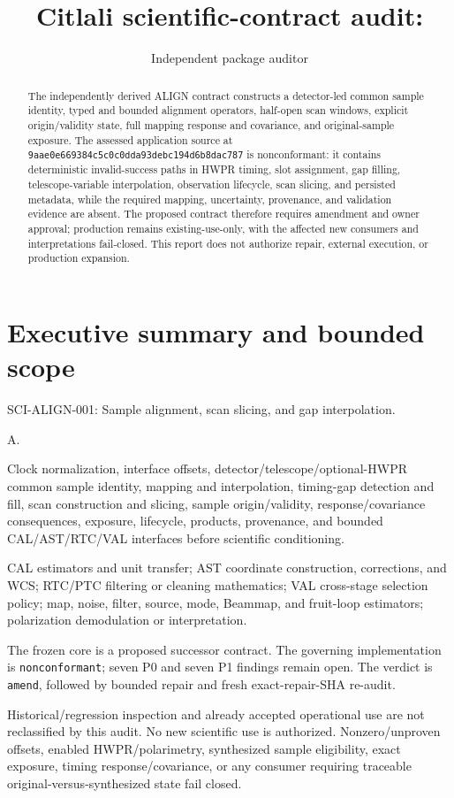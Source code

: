 \documentclass[11pt]{article}
\title{\AuditPackageName\\
\large Citlali scientific-contract audit: \AuditPackageID}
\author{Independent package auditor}
\date{\AuditDate}
\newcommand{\code}[1]{\nolinkurl{#1}}
\newcommand{\AuditPackageID}{SCI-ALIGN-001}
\newcommand{\AuditPackageName}{Sample alignment, scan slicing, and gap interpolation}
\newcommand{\AuditTier}{A}
\newcommand{\AuditGoverningSHAPrint}{\code{9aae0e669384c5c0c0dd}\allowbreak\code{a93debc194d6b8dac787}}
\begin{document}
\maketitle

\begin{abstract}
The independently derived ALIGN contract constructs a detector-led common
sample identity, typed and bounded alignment operators, half-open scan
windows, explicit origin/validity state, full mapping response and covariance,
and original-sample exposure.  The assessed application source at
\AuditGoverningSHAPrint{} is nonconformant: it contains deterministic
invalid-success paths in HWPR timing, slot assignment, gap filling,
telescope-variable interpolation, observation lifecycle, scan slicing, and
persisted metadata, while the required mapping, uncertainty, provenance, and
validation evidence are absent.  The proposed contract therefore requires
amendment and owner approval; production remains existing-use-only, with the
affected new consumers and interpretations fail-closed.  This report does not
authorize repair, external execution, or production expansion.
\end{abstract}
\section{Executive summary and bounded scope}

\begin{description}[style=nextline]
\item[Package] \AuditPackageID: \AuditPackageName.
\item[Tier] \AuditTier.
\item[Included transformation] Clock normalization, interface offsets,
detector/telescope/optional-HWPR common sample identity, mapping and
interpolation, timing-gap detection and fill, scan construction and slicing,
sample origin/validity, response/covariance consequences, exposure, lifecycle,
products, provenance, and bounded CAL/AST/RTC/VAL interfaces before scientific
conditioning.
\item[Explicit exclusions] CAL estimators and unit transfer; AST coordinate
construction, corrections, and WCS; RTC/PTC filtering or cleaning mathematics;
VAL cross-stage selection policy; map, noise, filter, source, mode, Beammap,
and fruit-loop
estimators; polarization demodulation or interpretation.
\item[Claimed result] The frozen core is a proposed successor contract.  The
governing implementation is \texttt{nonconformant}; seven P0 and seven P1
findings remain open.  The verdict is \texttt{amend}, followed by bounded
repair and fresh exact-repair-SHA re-audit.
\item[Consumer policy] Historical/regression inspection and already accepted
operational use are not reclassified by this audit.  No new scientific use is
authorized.  Nonzero/unproven offsets, enabled HWPR/polarimetry, synthesized
sample eligibility, exact exposure, timing response/covariance, or any consumer
requiring traceable original-versus-synthesized state fail closed.
\end{description}
\end{document}
